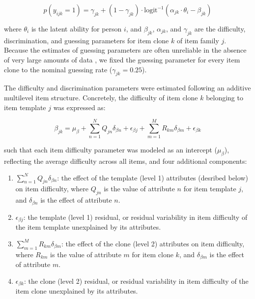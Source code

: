 \documentclass[a4paper,man,natbib]{apa6}
\begin{document}
\begin{equation} \label{eq:1}
p(y_{ijk} = 1) = \gamma_{jk} + (1-\gamma_{jk}) \cdot \text{logit}^{-1} \left( \alpha_{jk} \cdot \theta_i - \beta_{jk} \right)
\end{equation}

\noindent where $\theta_i$ is the latent ability for person $i$, and $\beta_{jk}$, $\alpha_{jk}$, and $\gamma_{jk}$ are the difficulty, discrimination, and guessing parameters for item clone $k$ of item family $j$. Because the estimates of guessing parameters are often unreliable in the absence of very large amounts of data \citep{han2012fixing}, we fixed the guessing parameter for every item clone to the nominal guessing rate ($\gamma_{jk} = 0.25$).

The difficulty and discrimination parameters were estimated following an additive multilevel item structure. Concretely, the difficulty of item clone $k$ belonging to item template $j$ was expressed as:  

\begin{equation}
\beta_{jk} = \mu_\beta + \sum_{n=1}^N Q_{jn} \delta_{\beta n} + \epsilon_{\beta j} + \sum_{m=1}^M R_{km} \delta_{\beta m} + \epsilon_{\beta k}
\end{equation}

\noindent such that each item difficulty parameter was modeled as an intercept ($\mu_\beta$), reflecting the average difficulty across all items, and four additional components:

\begin{enumerate}

\item $\sum_{n=1}^N Q_{jn} \delta_{\beta n}$: the effect of the template (level 1) attributes (desribed below) on item difficulty, where $Q_{jn}$ is the value of attribute $n$ for item template $j$, and $\delta_{\beta n}$ is the effect of attribute $n$. 

\item $\epsilon_{\beta j}$: the template (level 1) residual, or residual variability in item difficulty of the item template unexplained by its attributes.

\item $\sum_{m=1}^M R_{km} \delta_{\beta m}$: the effect of the clone (level 2) attributes on item difficulty, where $R_{km}$ is the value of attribute $m$ for item clone $k$, and $\delta_{\beta m}$ is the effect of attribute $m$. 

\item $\epsilon_{\beta k}$: the clone (level 2) residual, or residual variability in item difficulty of the item clone unexplained by its attributes.

\end{enumerate}
\end{document}
